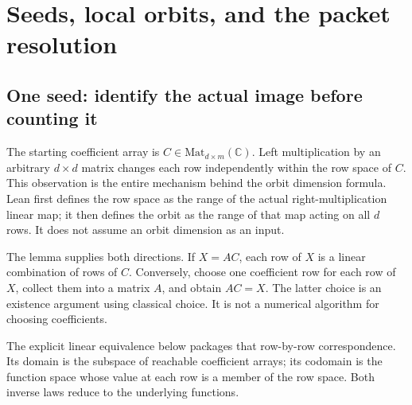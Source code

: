 \section{Seeds, local orbits, and the packet resolution}
\label{sec:seeds}

\subsection{One seed: identify the actual image before counting it}
The starting coefficient array is $C\in\mathrm{Mat}_{d\times m}(\mathbb C)$. Left multiplication by an arbitrary $d\times d$ matrix changes each row independently within the row space of $C$. This observation is the entire mechanism behind the orbit dimension formula. Lean first defines the row space as the range of the actual right-multiplication linear map; it then defines the orbit as the range of that map acting on all $d$ rows. It does not assume an orbit dimension as an input.


The lemma  supplies both directions. If $X=AC$, each row of $X$ is a linear combination of rows of $C$. Conversely, choose one coefficient row for each row of $X$, collect them into a matrix $A$, and obtain $AC=X$. The latter choice is an existence argument using classical choice. It is not a numerical algorithm for choosing coefficients.

The explicit linear equivalence below packages that row-by-row correspondence. Its domain is the subspace of reachable coefficient arrays; its codomain is the function space whose value at each row is a member of the row space. Both inverse laws reduce to the underlying functions.



